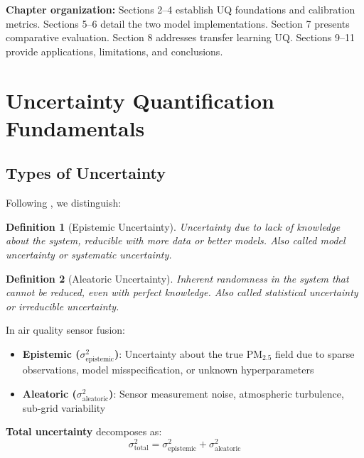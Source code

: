 \documentclass[11pt,letterpaper]{article}
\newtheorem{definition}{Definition}
\begin{document}
\textbf{Chapter organization:} Sections 2--4 establish UQ foundations and calibration metrics. Sections 5--6 detail the two model implementations. Section 7 presents comparative evaluation. Section 8 addresses transfer learning UQ. Sections 9--11 provide applications, limitations, and conclusions.

\section{Uncertainty Quantification Fundamentals} \label{sec:foundations}

\subsection{Types of Uncertainty}

Following \citet{derkiureghian2009aleatory}, we distinguish:

\begin{definition}[Epistemic Uncertainty]
Uncertainty due to lack of knowledge about the system, reducible with more data or better models. Also called \emph{model uncertainty} or \emph{systematic uncertainty}.
\end{definition}

\begin{definition}[Aleatoric Uncertainty]
Inherent randomness in the system that cannot be reduced, even with perfect knowledge. Also called \emph{statistical uncertainty} or \emph{irreducible uncertainty}.
\end{definition}

In air quality sensor fusion:
\begin{itemize}
    \item \textbf{Epistemic ($\sigma^2_{\text{epistemic}}$)}: Uncertainty about the true PM$_{2.5}$ field due to sparse observations, model misspecification, or unknown hyperparameters
    \item \textbf{Aleatoric ($\sigma^2_{\text{aleatoric}}$)}: Sensor measurement noise, atmospheric turbulence, sub-grid variability
\end{itemize}

\textbf{Total uncertainty} decomposes as:
\begin{equation}
\sigma^2_{\text{total}} = \sigma^2_{\text{epistemic}} + \sigma^2_{\text{aleatoric}}
\label{eq:total_uncertainty}
\end{equation}
\end{document}
